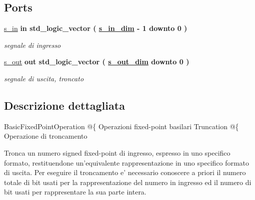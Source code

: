 \subsection*{Ports}
 \begin{DoxyCompactItemize}
\item 
\hyperlink{classtruncate_a6d6bd3ddfff26c223f1752f25545e304}{s\+\_\+in}  {\bfseries {\bfseries \textcolor{vhdlchar}{in}\textcolor{vhdlchar}{ }}} {\bfseries \textcolor{vhdlchar}{std\+\_\+logic\+\_\+vector}\textcolor{vhdlchar}{ }\textcolor{vhdlchar}{(}\textcolor{vhdlchar}{ }\textcolor{vhdlchar}{ }\textcolor{vhdlchar}{ }\textcolor{vhdlchar}{ }{\bfseries \hyperlink{classtruncate_ad3d18243ad6fe53a2277e2aa9b94ca45}{s\+\_\+in\+\_\+dim}} \textcolor{vhdlchar}{-\/}\textcolor{vhdlchar}{ } \textcolor{vhdldigit}{1} \textcolor{vhdlchar}{ }\textcolor{vhdlchar}{downto}\textcolor{vhdlchar}{ }\textcolor{vhdlchar}{ } \textcolor{vhdldigit}{0} \textcolor{vhdlchar}{ }\textcolor{vhdlchar}{)}\textcolor{vhdlchar}{ }} 
\begin{DoxyCompactList}\small\item\em segnale di ingresso \end{DoxyCompactList}\item 
\hyperlink{classtruncate_a7c0b5e84820296cfa624ce710d19debd}{s\+\_\+out}  {\bfseries {\bfseries \textcolor{vhdlchar}{out}\textcolor{vhdlchar}{ }}} {\bfseries \textcolor{vhdlchar}{std\+\_\+logic\+\_\+vector}\textcolor{vhdlchar}{ }\textcolor{vhdlchar}{(}\textcolor{vhdlchar}{ }\textcolor{vhdlchar}{ }\textcolor{vhdlchar}{ }\textcolor{vhdlchar}{ }{\bfseries \hyperlink{classtruncate_a8b62f8bfecb0fab845995b8b051101bc}{s\+\_\+out\+\_\+dim}} \textcolor{vhdlchar}{ }\textcolor{vhdlchar}{downto}\textcolor{vhdlchar}{ }\textcolor{vhdlchar}{ } \textcolor{vhdldigit}{0} \textcolor{vhdlchar}{ }\textcolor{vhdlchar}{)}\textcolor{vhdlchar}{ }} 
\begin{DoxyCompactList}\small\item\em segnale di uscita, troncato \end{DoxyCompactList}\end{DoxyCompactItemize}


\subsection{Descrizione dettagliata}
Basic\+Fixed\+Point\+Operation @\{  Operazioni fixed-\/point basilari  Truncation @\{  Operazione di troncamento

Tronca un numero signed fixed-\/point di ingresso, espresso in uno specifico formato, restituendone un'equivalente rappresentazione in uno specifico formato di uscita. Per eseguire il troncamento e' necessario conoscere a priori il numero totale di bit usati per la rappresentazione del numero in ingresso ed il numero di bit usati per rappresentare la sua parte intera. 

